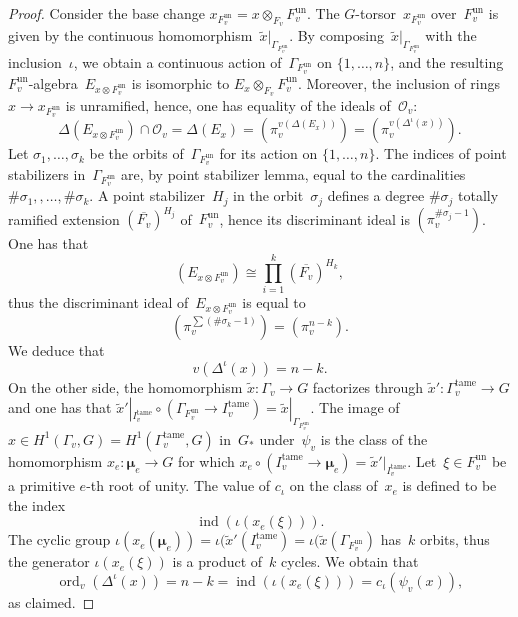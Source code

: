 \documentclass[a4paper,english,12pt]{amsart}
\newcommand{\QQ}{\mathbb{Q}}
\newcommand{\doots}{,\dots ,}
\newcommand{\Fv}{F_v}
\newcommand{\Ov}{\mathcal O _v}
\newcommand{\piv}{\pi_v}
\newcommand{\muu}{\boldsymbol{\mu}}
\DeclareMathOperator{\ind}{ind}
\DeclareMathOperator{\ord}{ord}
\DeclareMathOperator{\un}{un}
\DeclareMathOperator{\tame}{{tame}}
\numberwithin{equation}{subsection}
\begin{document}
\begin{proof}
Consider the base change $x_{\Fv^{\un}}=x\otimes _{\Fv}\Fv^{\un}$. The $G$-torsor~$x_{\Fv^{\un}}$ over~$\Fv^{\un}$ is given by the continuous homomorphism~$\widetilde x|_{\Gamma_{\Fv^{\un}}}$. By composing~$\widetilde x|_{\Gamma_{\Fv^{\un}}}$ with the inclusion~$\iota$, we obtain a continuous action of~$\Gamma_{\Fv^{\un}}$ on $\{1\doots n\}$, and the resulting $\Fv^{\un}$-algebra~$E_{x\otimes {\Fv^{\un}}}$ is isomorphic to $E_x\otimes_{\Fv}\Fv^{\un}$.  Moreover, the inclusion of rings $x\to x_{\Fv^{\un}}$ is unramified, hence, one has equality of the ideals of~$\Ov$:
$$\Delta(E_{x\otimes\Fv^{\un}})\cap\Ov=\Delta(E_x)=(\piv^{v(\Delta(E_x))})=(\piv^{v(\Delta^{\iota}(x))}).$$ 
Let $\sigma_1\doots \sigma_k$ be the orbits of~$\Gamma_{\Fv^{\un}}$ for its action on $\{1\doots n\}$. The indices of point stabilizers in~$\Gamma_{\Fv^{\un}}$ are, by point stabilizer lemma, equal to the cardinalities $\# \sigma_1, \doots \#\sigma_k$. A point stabilizer~$H_j$ in the orbit~$\sigma_j$ defines a degree $\#\sigma_j$ totally ramified extension $(\overline{F_v})^{H_j}$ of~$\Fv^{\un}$, hence its discriminant ideal is $(\piv^{\#\sigma_j -1})$. One has that $$(E_{x\otimes{\Fv^{\un}}})\cong\prod_{i=1}^k(\overline{F_v})^{H_k},$$ thus the discriminant ideal of~$E_{x\otimes{\Fv^{\un}}}$ is equal to $$(\piv^{\sum (\#\sigma_k-1)})=(\piv^{n-k}).$$ We deduce that $$v(\Delta^{\iota}(x))=n-k.$$ On the other side, the homomorphism $\widetilde x:\Gamma_v\to G$ factorizes through $\widetilde x':\Gamma_v^{\tame}\to G$ and one has that $\widetilde x'|_{I_v^{\tame}}\circ (\Gamma_{\Fv^{\un}}\to I_v^{\tame})=\widetilde x|_{\Gamma_{\Fv^{\un}}}.$ The image of $x\in H^1(\Gamma_v, G)=H^1(\Gamma_v^{\tame}, G)$ in~$G_*$ under~$\psi_v$ is the class of the homomorphism $x_e:\muu_e\to G$ for which $x_e\circ (I_v^{\tame}\to\muu_e)=\widetilde x'|_{I_v^{\tame}}$. Let~$\xi\in F_v^{\un}$ be a primitive $e$-th root of unity. The value of $c_{{\iota}}$ on the class of~$x_e$ is defined to be the index $$\ind(\iota(x_e(\xi))).$$ The cyclic group $\iota(x_e(\muu_e))=\iota (\widetilde x'(I^{\tame}_v)=\iota(\widetilde x(\Gamma_{\Fv^{\un}})$ has~$k$ orbits, thus the generator $\iota(x_e(\xi))$ is a product of~$k$ cycles. We obtain that $$\ord_v(\Delta^{\iota}(x))=n-k=\ind(\iota(x_e(\xi)))=c_{{\iota}}(\psi_v(x)),$$ as claimed.
\end{proof}
\end{document}
